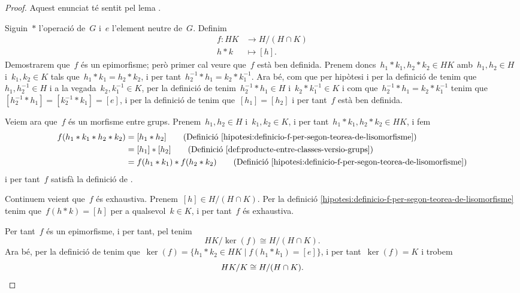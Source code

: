 \documentclass[../estructures-algebraiques.tex]{subfiles}
\begin{document}
    \begin{proof}
        Aquest enunciat té sentit pel lema .

        Siguin~\(\ast\) l'operació de~\(G\) i~\(e\) l'element neutre de~\(G\).
        Definim
        \begin{align}\label{hipotesi:definicio-f-per-segon-teorea-de-lisomorfisme}
        f\colon HK&\longrightarrow H/(H\cap K)\\
        h\ast k&\longmapsto [h].\nonumber
        \end{align}
        Demostrarem que~\(f\) és un epimorfisme; però primer cal veure que~\(f\) està ben definida.
        Prenem doncs~\(h_{1}\ast k_{1},h_{2}\ast k_{2}\in HK\) amb~\(h_{1},h_{2}\in H\) i~\(k_{1},k_{2}\in K\) tals que~\(h_{1}\ast k_{1}=h_{2}\ast k_{2}\), i per tant~\(h_{2}^{-1}\ast h_{1}=k_{2}\ast k_{1}^{-1}\).
        Ara bé, com que per hipòtesi i per la definició de  tenim que~\(h_{1},h_{2}^{-1}\in H\) i a la vegada~\(k_{2},k_{1}^{-1}\in K\), per la definició de  tenim~\(h_{2}^{-1}\ast h_{1}\in H\) i~\(k_{2}\ast k_{1}^{-1}\in K\) i com que~\(h_{2}^{-1}\ast h_{1}=k_{2}\ast k_{1}^{-1}\) tenim que~\([h_{2}^{-1}\ast h_{1}]=[k_{2}^{-1}\ast k_{1}]=[e]\), i per la definició de  %
        tenim que~\([h_{1}]=[h_{2}]\) i per tant~\(f\) està ben definida.

        Veiem ara que~\(f\) és un morfisme entre grups.
        Prenem~\(h_{1},h_{2}\in H\) i~\(k_{1},k_{2}\in K\), i per tant~\(h_{1}\ast k_{1},h_{2}\ast k_{2}\in HK\), i fem
        \begin{align*}
        f(h_{1}\ast k_{1}\ast h_{2}\ast k_{2})&=[h_{1}\ast h_{2}]\tag{Definició \eqref{hipotesi:definicio-f-per-segon-teorea-de-lisomorfisme}}\\
        &=[h_{1}]\ast[h_{2}]\tag{Definició \eqref{def:producte-entre-classes-versio-grups}}\\
        &=f(h_{1}\ast k_{1})\ast f(h_{2}\ast k_{2})\tag{Definició \eqref{hipotesi:definicio-f-per-segon-teorea-de-lisomorfisme}}
        \end{align*}
        i per tant~\(f\) satisfà la definició de .

        Continuem veient que~\(f\) és exhaustiva.
        Prenem~\([h]\in H/(H\cap K)\).
        Per la definició \eqref{hipotesi:definicio-f-per-segon-teorea-de-lisomorfisme} tenim que~\(f(h\ast k)=[h]\) per a qualsevol~\(k\in K\), i per tant~\(f\) és exhaustiva.

        Per tant~\(f\) és un epimorfisme, i per tant, pel  tenim
        \[
            HK/\ker(f)\cong H/(H\cap K).
        \]
        Ara bé, per la definició de  tenim que~\(\ker(f)=\{h_{1}\ast k_{2}\in HK\mid f(h_{1}\ast k_{1})=[e]\}\), i per tant~\(\ker(f)=K\) i trobem
        \[
            HK/K\cong H/(H\cap K).\qedhere
        \]
    \end{proof}
\end{document}
